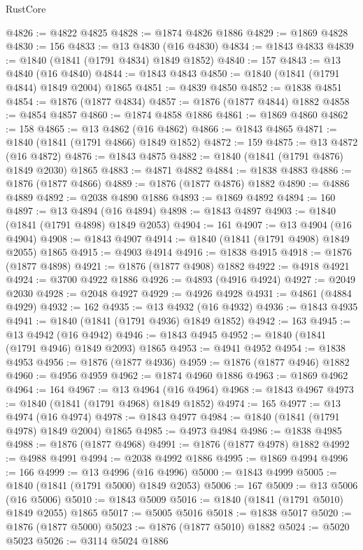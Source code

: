 \begin{lexlean}{RustCore}
\begin{coremodule}
@4826 := @4822 @4825
@4828 := @1874 @4826 @1886
@4829 := @1869 @4828
@4830 := 156
@4833 := @13 @4830 (@16 @4830)
@4834 := @1843 @4833
@4839 := @1840 (@1841 (@1791 @4834) @1849 @1852)
@4840 := 157
@4843 := @13 @4840 (@16 @4840)
@4844 := @1843 @4843
@4850 := @1840 (@1841 (@1791 @4844) @1849 @2004) @1865
@4851 := @4839 @4850
@4852 := @1838 @4851
@4854 := @1876 (@1877 @4834)
@4857 := @1876 (@1877 @4844) @1882
@4858 := @4854 @4857
@4860 := @1874 @4858 @1886
@4861 := @1869 @4860
@4862 := 158
@4865 := @13 @4862 (@16 @4862)
@4866 := @1843 @4865
@4871 := @1840 (@1841 (@1791 @4866) @1849 @1852)
@4872 := 159
@4875 := @13 @4872 (@16 @4872)
@4876 := @1843 @4875
@4882 := @1840 (@1841 (@1791 @4876) @1849 @2030) @1865
@4883 := @4871 @4882
@4884 := @1838 @4883
@4886 := @1876 (@1877 @4866)
@4889 := @1876 (@1877 @4876) @1882
@4890 := @4886 @4889
@4892 := @2038 @4890 @1886
@4893 := @1869 @4892
@4894 := 160
@4897 := @13 @4894 (@16 @4894)
@4898 := @1843 @4897
@4903 := @1840 (@1841 (@1791 @4898) @1849 @2053)
@4904 := 161
@4907 := @13 @4904 (@16 @4904)
@4908 := @1843 @4907
@4914 := @1840 (@1841 (@1791 @4908) @1849 @2055) @1865
@4915 := @4903 @4914
@4916 := @1838 @4915
@4918 := @1876 (@1877 @4898)
@4921 := @1876 (@1877 @4908) @1882
@4922 := @4918 @4921
@4924 := @3700 @4922 @1886
@4926 := @4893 (@4916 @4924)
@4927 := @2049 @2030
@4928 := @2048 @4927
@4929 := @4926 @4928
@4931 := @4861 (@4884 @4929)
@4932 := 162
@4935 := @13 @4932 (@16 @4932)
@4936 := @1843 @4935
@4941 := @1840 (@1841 (@1791 @4936) @1849 @1852)
@4942 := 163
@4945 := @13 @4942 (@16 @4942)
@4946 := @1843 @4945
@4952 := @1840 (@1841 (@1791 @4946) @1849 @2093) @1865
@4953 := @4941 @4952
@4954 := @1838 @4953
@4956 := @1876 (@1877 @4936)
@4959 := @1876 (@1877 @4946) @1882
@4960 := @4956 @4959
@4962 := @1874 @4960 @1886
@4963 := @1869 @4962
@4964 := 164
@4967 := @13 @4964 (@16 @4964)
@4968 := @1843 @4967
@4973 := @1840 (@1841 (@1791 @4968) @1849 @1852)
@4974 := 165
@4977 := @13 @4974 (@16 @4974)
@4978 := @1843 @4977
@4984 := @1840 (@1841 (@1791 @4978) @1849 @2004) @1865
@4985 := @4973 @4984
@4986 := @1838 @4985
@4988 := @1876 (@1877 @4968)
@4991 := @1876 (@1877 @4978) @1882
@4992 := @4988 @4991
@4994 := @2038 @4992 @1886
@4995 := @1869 @4994
@4996 := 166
@4999 := @13 @4996 (@16 @4996)
@5000 := @1843 @4999
@5005 := @1840 (@1841 (@1791 @5000) @1849 @2053)
@5006 := 167
@5009 := @13 @5006 (@16 @5006)
@5010 := @1843 @5009
@5016 := @1840 (@1841 (@1791 @5010) @1849 @2055) @1865
@5017 := @5005 @5016
@5018 := @1838 @5017
@5020 := @1876 (@1877 @5000)
@5023 := @1876 (@1877 @5010) @1882
@5024 := @5020 @5023
@5026 := @3114 @5024 @1886

\end{coremodule}
\end{lexlean}
